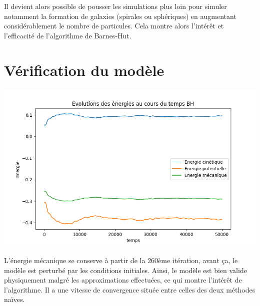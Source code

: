 Il devient alors possible de pousser les simulations plus loin pour simuler notamment la formation de galaxies (spirales ou sphériques) en augmentant considérablement le nombre de particules. Cela montre alors l'intérêt et l'efficacité de l'algorithme de Barnes-Hut.

\section{Vérification du modèle}

\begin{center}
\includegraphics[scale=0.6]{./resultats/Energy_BH.png}
\captionsetup{hypcap=false}
\label{fig9}
\end{center}

L'énergie mécanique se conserve à partir de la $260$ème itération, avant ça, le modèle est perturbé par les conditions initiales. Ainsi, le modèle est bien valide physiquement malgré les approximations effectuées, ce qui montre l'intérêt de l'algorithme. Il a une vitesse de convergence située entre celles des deux méthodes naïves.

